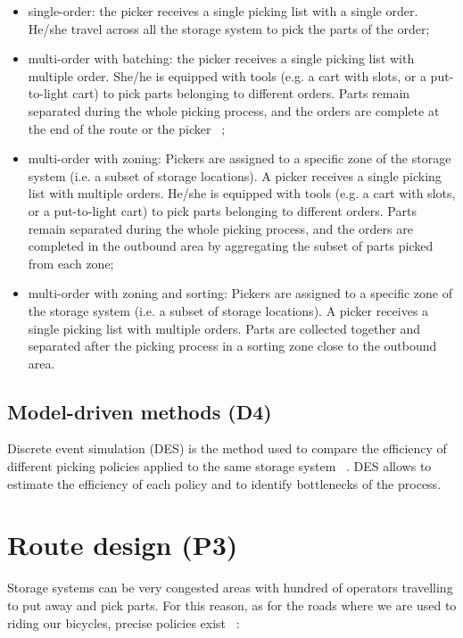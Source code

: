 \begin{itemize}
    \item single-order: the picker receives a single picking list with a single order. He/she travel across all the storage system to pick the parts of the order;
    \item multi-order with batching: the picker receives a single picking list with multiple order. She/he is equipped with tools (e.g. a cart with slots, or a put-to-light cart) to pick parts belonging to different orders. Parts remain separated during the whole picking process, and the orders are complete at the end of the route or the picker ~\cite{Chen2005a, Valle2017, Zulj2018};
    \item multi-order with zoning: Pickers are assigned to a specific zone of the storage system (i.e. a subset of storage locations). A picker receives a single picking list with multiple orders. He/she is equipped with tools (e.g. a cart with slots, or a put-to-light cart) to pick parts belonging to different orders. Parts remain separated during the whole picking process, and the orders are completed in the outbound area by aggregating the subset of parts picked from each zone;
    \item multi-order with zoning and sorting: Pickers are assigned to a specific zone of the storage system (i.e. a subset of storage locations). A picker receives a single picking list with multiple orders. Parts are collected together and separated after the picking process in a sorting zone close to the outbound area.

\end{itemize}

\subsection{Model-driven methods (D4)}
Discrete event simulation (DES) is the method used to compare the efficiency of different picking policies applied to the same storage system ~\cite{Caron2007, Lu2016}. DES allows to estimate the efficiency of each policy and to identify bottlenecks of the process. 

\section{Route design (P3)}

Storage systems can be very congested areas with hundred of operators travelling to put away and pick parts. For this reason, as for the roads where we are used to riding our bicycles, precise policies exist ~\cite{Caron2007, Petersen1999, Roodbergen2001, Roodbergen2006}:

